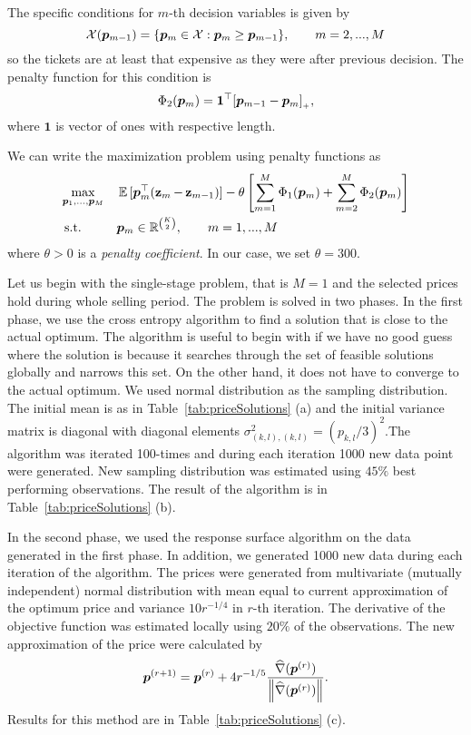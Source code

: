 The specific conditions for $m$-th decision variables is given by
\[
	\mathcal{X} (\bm{p}_{m-1}) = \{ \bm{p}_m \in \mathcal{X}: \bm{p}_m \geq \bm{p}_{m-1} \}, \qquad m = 2, ..., M
\]
so the tickets are at least that expensive as they were after previous decision. The penalty function for this condition is
\[
	\Phi_2 (\bm{p}_m) = \bm{1}^{\top} [\bm{p}_{m-1} - \bm{p}_m]_{_{+}},
\]
where $\bm{1}$ is vector of ones with respective length.

We can write the maximization problem using penalty functions as
\begin{equation*}
	\begin{aligned}
		& \underset{\bm{p}_1, ..., \bm{p}_M}{\max} & & \operatorname{\mathbb{E}\,} [\bm{p}_{m}^{\top} (\operatorname{\mathbf{z}}_m - \operatorname{\mathbf{z}}_{m-1})] - \theta \left[ \sum_{m=1}^M \Phi_1 (\bm{p}_m) + \sum_{m=2}^M \Phi_2 (\bm{p}_m) \right] \\
		& \operatorname{\textrm{s.t.}} & & \bm{p}_m \in \mathbb{R}^{\binom{K}{2}}, \qquad m = 1, ..., M
	\end{aligned}
\end{equation*}
where $\theta > 0$ is a \emph{penalty coefficient}. In our case, we set $\theta = 300$.

Let us begin with the single-stage problem, that is $M=1$ and the selected prices hold during whole selling period. The problem is solved in two phases. In the first phase, we use the cross entropy algorithm to find a solution that is close to the actual optimum. The algorithm is useful to begin with if we have no good guess where the solution is because it searches through the set of feasible solutions globally and narrows this set. On the other hand, it does not have to converge to the actual optimum. We used normal distribution as the sampling distribution. The initial mean is as in Table~\ref{tab:priceSolutions} (a) and the initial variance matrix is diagonal with diagonal elements $\sigma_{(k,l), (k,l)}^2 = (p_{k,l} / 3)^2$.The algorithm was iterated 100-times and during each iteration 1000 new data point were generated. New sampling distribution was estimated using $45\%$ best performing observations. The result of the algorithm is in Table~\ref{tab:priceSolutions} (b).

In the second phase, we used the response surface algorithm on the data generated in the first phase. In addition, we generated 1000 new data during each iteration of the algorithm. The prices were generated from multivariate (mutually independent) normal distribution with mean equal to current approximation of the optimum price and variance $10 r^{-1/4}$ in $r$-th iteration. The derivative of the objective function was estimated locally using $20\%$ of the observations. The new approximation of the price were calculated by
\[
	\bm{p}^{(r+1)} = \bm{p}^{(r)} + 4 r^{-1/5} \frac{\widehat{\nabla} (\bm{p}^{(r)})}{ \left\| \widehat{\nabla} (\bm{p}^{(r)}) \right\| }.
\]
Results for this method are in Table~\ref{tab:priceSolutions} (c).

